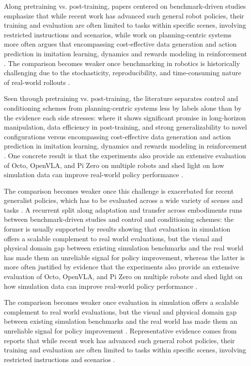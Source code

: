 \documentclass[a4paper,11pt]{article}
\begin{document}
Along pretraining vs. post-training, papers centered on benchmark-driven studies emphasize that while recent work has advanced such general robot policies, their training and evaluation are often limited to tasks within specific scenes, involving restricted instructions and scenarios, while work on planning-centric systems more often argues that encompassing cost-effective data generation and action prediction in imitation learning, dynamics and rewards modeling in reinforcement \citep{Dai2025Manitaskgen,Jain2025Polaris,Mei2026Video}. The comparison becomes weaker once benchmarking in robotics is historically challenging due to the stochasticity, reproducibility, and time-consuming nature of real-world rollouts \citep{Jain2025Polaris}.

Seen through pretraining vs. post-training, the literature separates control and conditioning schemes from planning-centric systems less by labels alone than by the evidence each side stresses: where it shows significant promise in long-horizon manipulation, data efficiency in post-training, and strong generalizability to novel configurations versus encompassing cost-effective data generation and action prediction in imitation learning, dynamics and rewards modeling in reinforcement \citep{Li2026Causal,Jlg2025Robot,Mei2026Video}. One concrete result is that the experiments also provide an extensive evaluation of Octo, OpenVLA, and Pi Zero on multiple robots and shed light on how simulation data can improve real-world policy performance \citep{Jlg2025Robot}.

The comparison becomes weaker once this challenge is exacerbated for recent generalist policies, which has to be evaluated across a wide variety of scenes and tasks \citep{Jain2025Polaris}. A recurrent split along adaptation and transfer across embodiments runs between benchmark-driven studies and control and conditioning schemes: the former is usually supported by results showing that evaluation in simulation offers a scalable complement to real world evaluations, but the visual and physical domain gap between existing simulation benchmarks and the real world has made them an unreliable signal for policy improvement, whereas the latter is more often justified by evidence that the experiments also provide an extensive evaluation of Octo, OpenVLA, and Pi Zero on multiple robots and shed light on how simulation data can improve real-world policy performance \citep{Jain2025Polaris,Dai2025Manitaskgen,Jlg2025Robot,Li2026Causal}.

The comparison becomes weaker once evaluation in simulation offers a scalable complement to real world evaluations, but the visual and physical domain gap between existing simulation benchmarks and the real world has made them an unreliable signal for policy improvement \citep{Jain2025Polaris}. Representative evidence comes from reports that while recent work has advanced such general robot policies, their training and evaluation are often limited to tasks within specific scenes, involving restricted instructions and scenarios \citep{Dai2025Manitaskgen}.
\end{document}
